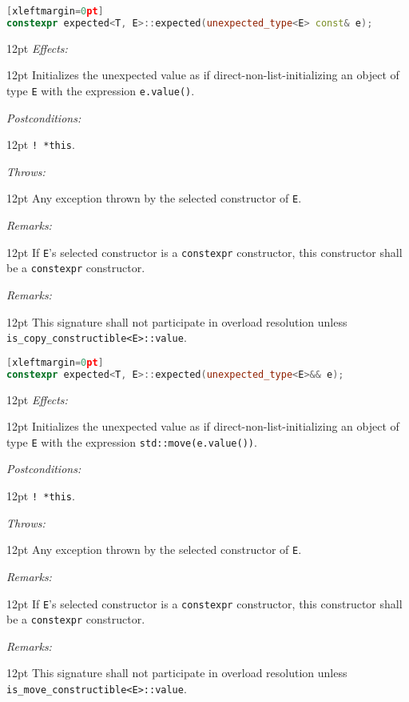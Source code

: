 \documentclass[a4paper,10pt]{article}
\newcommand{\cpp}[1]{\lstinline{#1}}
\newcommand{\wordingItem}[1]{\noindent\textit{#1:}}
\newenvironment{wordingTextItem}[1]{\wordingItem{#1}\vspace{2pt}\noindent\begin{adjustwidth}{12pt}{}}{\vspace{2pt}\end{adjustwidth}}
\newenvironment{wordingPara}{\begin{adjustwidth}{12pt}{}}{\end{adjustwidth}}
\begin{document}
\begin{lstlisting}[language=C++][xleftmargin=0pt]
constexpr expected<T, E>::expected(unexpected_type<E> const& e);
\end{lstlisting}
\begin{wordingPara}
\begin{wordingTextItem}{Effects}
Initializes the unexpected value as if direct-non-list-initializing an object of type \cpp{E} with the expression \cpp{e.value()}.
\end{wordingTextItem}
\begin{wordingTextItem}{Postconditions}
\cpp{! *this}.
\end{wordingTextItem}
\begin{wordingTextItem}{Throws}
Any exception thrown by the selected constructor of \cpp{E}.
\end{wordingTextItem}
\begin{wordingTextItem}{Remarks}
If \cpp{E}'s selected constructor is a \cpp{constexpr} constructor, this constructor shall be a \cpp{constexpr} constructor.
\end{wordingTextItem}
\begin{wordingTextItem}{Remarks}
This signature shall not participate in overload resolution unless\\
\cpp{is_copy_constructible<E>::value}. 
\end{wordingTextItem}
\end{wordingPara}

\begin{lstlisting}[language=C++][xleftmargin=0pt]
constexpr expected<T, E>::expected(unexpected_type<E>&& e); 
\end{lstlisting}
\begin{wordingPara}
\begin{wordingTextItem}{Effects}
Initializes the unexpected value as if direct-non-list-initializing an object of type \cpp{E} with the expression \cpp{std::move(e.value())}.
\end{wordingTextItem}
\begin{wordingTextItem}{Postconditions}
\cpp{! *this}.
\end{wordingTextItem}
\begin{wordingTextItem}{Throws}
Any exception thrown by the selected constructor of \cpp{E}.
\end{wordingTextItem}
\begin{wordingTextItem}{Remarks}
If \cpp{E}'s selected constructor is a \cpp{constexpr} constructor, this constructor shall be a \cpp{constexpr} constructor.
\end{wordingTextItem}
\begin{wordingTextItem}{Remarks}
This signature shall not participate in overload resolution unless\\
\cpp{is_move_constructible<E>::value}.
\end{wordingTextItem}
\end{wordingPara}
\end{document}

